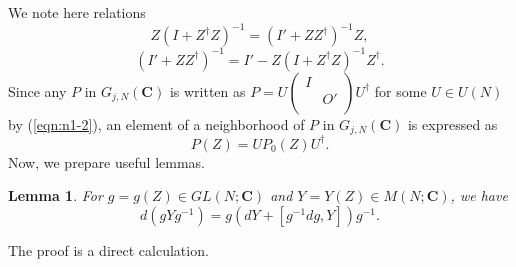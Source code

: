 \documentclass[makeidx,12pt,openany]{report}
\newtheorem{lem}[df]{Lemma}
\begin{document}
We note here relations
\begin{equation}
 Z(I+Z^{\dag}Z)^{-1}=(I'+Z Z^{\dag})^{-1}Z,
\end{equation}
\begin{equation}
 (I'+Z Z^{\dag})^{-1}=I'-Z(I+Z^{\dag}Z)^{-1}Z^{\dag}.
 \label{eqn:n1-9}
\end{equation}
Since any $P$ in $G_{j,N}({\mathbf{C}})$ is written as 
$P=U
    \left(
       \begin{array}{cc}
           I &    \\
             & O' \\
       \end{array}
    \right) U^{\dag}$
for some $U \in U(N)$ by (\ref{eqn:n1-2}), an element of a neighborhood of $P$ in $G_{j,N}({\mathbf{C}})$ is expressed as
\begin{equation}
 P(Z)=U P_0(Z) U^{\dag}.
 \label{eqn:n1-10}
\end{equation}
Now, we prepare useful lemmas. 
\begin{lem}\label{lem:adj}
For $g=g(Z) \in GL(N;\mathbf{C})$ and 
$Y=Y(Z) \in M(N;\mathbf{C})$, we have 
\begin{equation}
 d(gYg^{-1})=g(dY+[g^{-1}dg,Y])g^{-1}. 
\end{equation}
\end{lem}
The proof is a direct calculation. 
\end{document}
